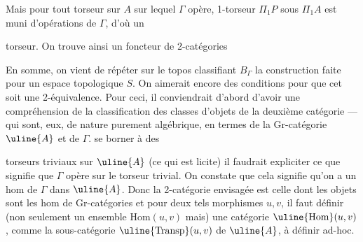 Mais pour tout torseur  sur \(A\) sur lequel \(\Gamma\) opère,   1-torseur  \(\Pi_1P\) sous \(\Pi_1A\)  est muni d'opérations de \(\Gamma\), d'où un



 torseur. On trouve ainsi un foncteur de 2-catégories

En somme, on vient de répéter sur le topos classifiant \(B_\Gamma\) la construction faite  pour un espace topologique \(S\). On aimerait encore  des conditions pour que cet   soit une 2-équivalence. Pour ceci, il conviendrait d'abord d'avoir une compréhension de la classification des classes  d'objets de la deuxième catégorie --- qui sont, eux, de nature purement algébrique, en termes de la Gr-catégorie \(\uline{A}\) et de \(\Gamma\).  se borner à des



torseurs triviaux sur \(\uline{A}\) (ce qui est licite) il faudrait expliciter ce que signifie que \(\Gamma\) opère sur le torseur trivial. On constate que cela signifie qu'on a un hom  de  \(\Gamma\) dans \(\uline{A}\). Donc la 2-catégorie envisagée est celle dont les objets sont les hom de Gr-catégories
et pour deux tels morphismes \(u,v\), il faut définir (non seulement un ensemble \(\mathrm{Hom}(u,v)\) mais) une catégorie \(\uline{\mathrm{Hom}}(u,v)\), comme la sous-catégorie \(\uline{\mathrm{Transp}}(u,v)\) de \(\uline{A}\), à définir ad-hoc.


